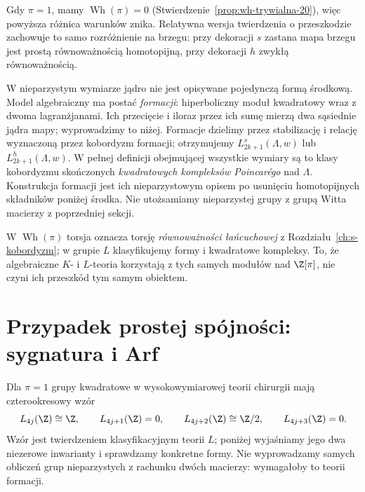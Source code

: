 Gdy $\pi=1$, mamy
$\operatorname{Wh}(\pi)=0$
(Stwierdzenie~\ref{prop:wh-trywialna-20}),
więc powyższa różnica warunków znika.
Relatywna wersja twierdzenia o przeszkodzie
zachowuje to samo rozróżnienie na brzegu:
przy dekoracji $s$ zastana mapa brzegu jest
prostą równoważnością homotopijną, przy
dekoracji $h$ zwykłą równoważnością.

W nieparzystym wymiarze jądro nie jest opisywane
pojedynczą formą środkową. Model algebraiczny ma
postać \emph{formacji}: hiperboliczny moduł
kwadratowy wraz z dwoma lagranżjanami. Ich
przecięcie i iloraz przez ich sumę mierzą dwa
sąsiednie jądra mapy; wyprowadzimy to niżej.
Formacje dzielimy przez stabilizację i relację
wyznaczoną przez kobordyzm formacji; otrzymujemy
$L^s_{2k+1}(\Lambda,w)$ lub $L^h_{2k+1}(\Lambda,w)$.
W pełnej definicji obejmującej wszystkie wymiary
są to klasy kobordyzmu skończonych
\emph{kwadratowych kompleksów Poincarégo}
nad $\Lambda$. Konstrukcja formacji jest ich
nieparzystowym opisem po usunięciu homotopijnych
składników poniżej środka. Nie utożsamiamy
nieparzystej grupy z grupą Witta macierzy z poprzedniej sekcji.

\begin{uwaga}
W $\operatorname{Wh}(\pi)$ torsja oznacza torsję
\emph{równoważności łańcuchowej} z
Rozdziału~\ref{ch:s-kobordyzm}; w grupie $L$
klasyfikujemy formy i kwadratowe kompleksy.
To, że algebraiczne $K$- i $L$-teoria korzystają
z tych samych modułów nad $\Z[\pi]$, nie czyni
ich przeszkód tym samym obiektem.
\end{uwaga}

\section{Przypadek prostej spójności: sygnatura i Arf}
\label{sec:obliczenia-LZ-22}

Dla $\pi=1$ grupy kwadratowe w wysokowymiarowej
teorii chirurgii mają czterookresowy wzór
\begin{equation}\label{eq:L-Z-22}
 L_{4j}(\Z)\cong\Z,\qquad
 L_{4j+1}(\Z)=0,\qquad
 L_{4j+2}(\Z)\cong\Z/2,\qquad
 L_{4j+3}(\Z)=0.
\end{equation}
Wzór jest twierdzeniem klasyfikacyjnym teorii $L$;
poniżej wyjaśniamy jego dwa niezerowe inwarianty
i sprawdzamy konkretne formy. Nie wyprowadzamy
samych obliczeń grup nieparzystych z rachunku
dwóch macierzy: wymagałoby to teorii formacji.

